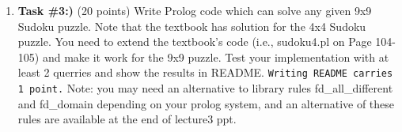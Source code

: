 \documentclass[paper=letter, fontsize=11pt]{scrartcl} %
\begin{document}
\begin{enumerate}
\item \textbf{Task \#3:)} (20 points) Write Prolog code which can solve any given 9x9 Sudoku puzzle. 
Note that the textbook has solution for the 4x4 Sudoku puzzle. You need to extend the textbook's code 
(i.e., sudoku4.pl on Page 104-105) and make it work for the 9x9 puzzle. Test your implementation with at least 
2 querries and show the results in README. \texttt{Writing README carries 1 point.} 
Note: you may need an alternative to library rules fd\_all\_different and fd\_domain 
depending on your prolog system, and an alternative of these rules are available at the end of lecture3 ppt.


    
    \end{enumerate}
\end{document}
